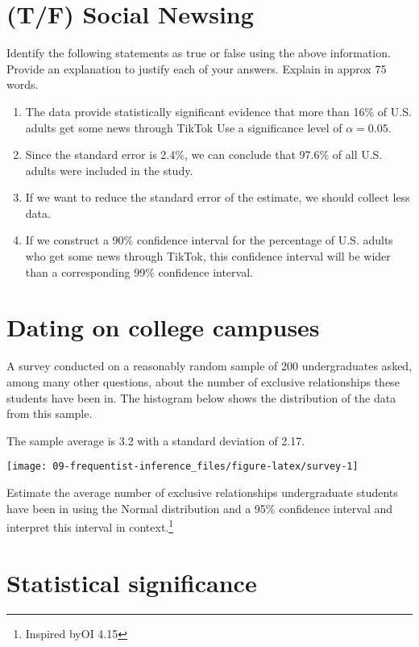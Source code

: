\documentclass[
]{article}
\begin{document}
\section{(T/F) Social Newsing}\label{tf-social-newsing}

Identify the following statements as true or false using the above
information. Provide an explanation to justify each of your answers.
Explain in approx 75 words.

\begin{enumerate}
\def\labelenumi{\alph{enumi}.}
\item
  The data provide statistically significant evidence that more than
  16\% of U.S. adults get some news through TikTok Use a significance
  level of \(\alpha = 0.05\).
\item
  Since the standard error is 2.4\%, we can conclude that 97.6\% of all
  U.S. adults were included in the study.
\item
  If we want to reduce the standard error of the estimate, we should
  collect less data.
\item
  If we construct a 90\% confidence interval for the percentage of U.S.
  adults who get some news through TikTok, this confidence interval will
  be wider than a corresponding 99\% confidence interval.
\end{enumerate}

\section{Dating on college campuses}\label{dating-on-college-campuses}

A survey conducted on a reasonably random sample of 200 undergraduates
asked, among many other questions, about the number of exclusive
relationships these students have been in. The histogram below shows the
distribution of the data from this sample.

The sample average is 3.2 with a standard deviation of 2.17.

\begin{center}\texttt{[image: 09-frequentist-inference\_files/figure-latex/survey-1]} \end{center}

Estimate the average number of exclusive relationships undergraduate
students have been in using the Normal distribution and a 95\%
confidence interval and interpret this interval in context.\footnote{Inspired
  byOI 4.15}

\section{Statistical significance}\label{statistical-significance}
\end{document}
